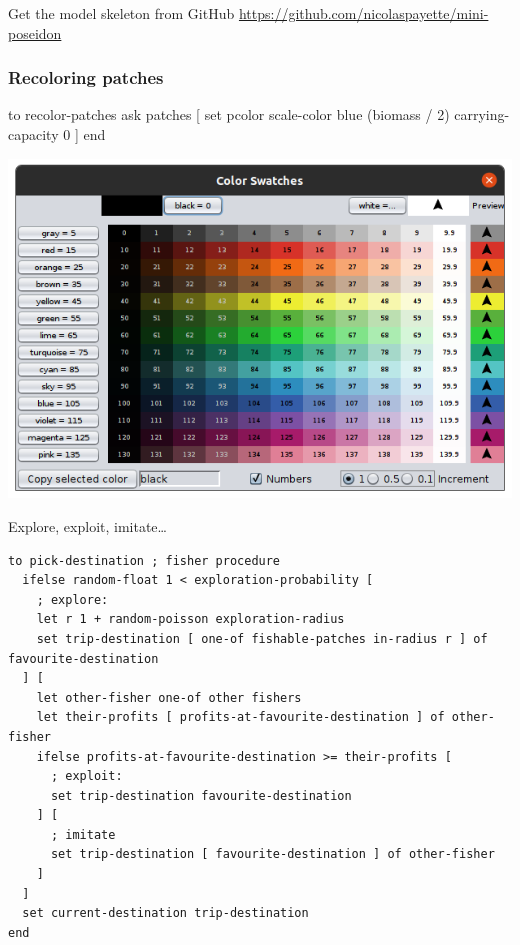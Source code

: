 \documentclass[table, 14pt, aspectratio=169]{beamer}
\begin{document}
\begin{frame}[t]
\end{frame}

\begin{frame}[fragile=singleslide]{Get the model skeleton from GitHub}
  \Large
  \centering
  \vfill
  \url{https://github.com/nicolaspayette/mini-poseidon}
  \vfill
\end{frame}

\begin{frame}[fragile=singleslide]\frametitle{Recoloring patches}
  \centering
  \begin{adjustbox}{max width=\linewidth}
    \begin{nlogo}
to recolor-patches
  ask patches [
    set pcolor scale-color blue (biomass / 2) carrying-capacity 0
  ]
end
    \end{nlogo}
  \end{adjustbox}
  \vfill
  \includegraphics[width=0.7\textheight]{images/swatches.png}
\end{frame}

\begin{frame}[fragile=singleslide]{Explore, exploit, imitate\ldots}\small
  \begin{adjustbox}{max height=0.8\textheight, max width = \linewidth}
    \begin{verbatim}
to pick-destination ; fisher procedure
  ifelse random-float 1 < exploration-probability [
    ; explore:
    let r 1 + random-poisson exploration-radius
    set trip-destination [ one-of fishable-patches in-radius r ] of favourite-destination
  ] [
    let other-fisher one-of other fishers
    let their-profits [ profits-at-favourite-destination ] of other-fisher
    ifelse profits-at-favourite-destination >= their-profits [
      ; exploit:
      set trip-destination favourite-destination
    ] [
      ; imitate
      set trip-destination [ favourite-destination ] of other-fisher
    ]
  ]
  set current-destination trip-destination
end
    \end{verbatim}  
  \end{adjustbox}
\end{frame}
\end{document}
